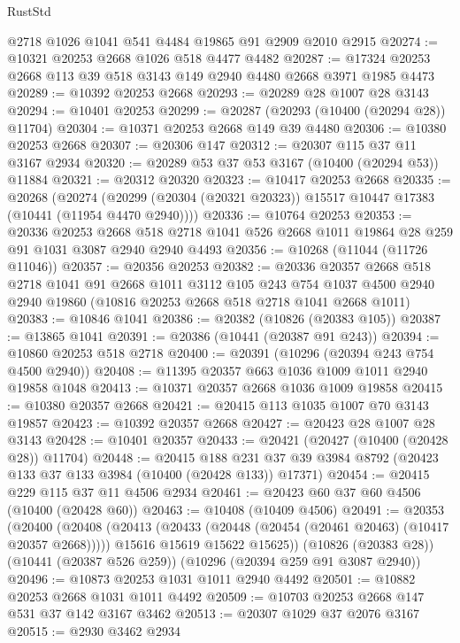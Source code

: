 \begin{lexlean}{RustStd}
\begin{coremodule}
    @2718
    @1026
    @1041
    @541
    @4484
    @19865
    @91
    @2909
    @2010
    @2915
@20274 := @10321 @20253 @2668 @1026 @518 @4477 @4482
@20287 := @17324 @20253 @2668 @113 @39 @518 @3143 @149 @2940 @4480 @2668 @3971 @1985 @4473
@20289 := @10392 @20253 @2668
@20293 := @20289 @28 @1007 @28 @3143
@20294 := @10401 @20253
@20299 := @20287 (@20293 (@10400 (@20294 @28)) @11704)
@20304 := @10371 @20253 @2668 @149 @39 @4480
@20306 := @10380 @20253 @2668
@20307 := @20306 @147
@20312 := @20307 @115 @37 @11 @3167 @2934
@20320 := @20289 @53 @37 @53 @3167 (@10400 (@20294 @53)) @11884
@20321 := @20312 @20320
@20323 := @10417 @20253 @2668
@20335 := @20268
    (@20274 (@20299 (@20304 (@20321 @20323)) @15517 @10447 @17383 (@10441 (@11954 @4470 @2940))))
@20336 := @10764 @20253
@20353 := @20336
    @20253
    @2668
    @518
    @2718
    @1041
    @526
    @2668
    @1011
    @19864
    @28
    @259
    @91
    @1031
    @3087
    @2940
    @2940
    @4493
@20356 := @10268 (@11044 (@11726 @11046))
@20357 := @20356 @20253
@20382 := @20336
    @20357
    @2668
    @518
    @2718
    @1041
    @91
    @2668
    @1011
    @3112
    @105
    @243
    @754
    @1037
    @4500
    @2940
    @2940
    @19860
    (@10816 @20253 @2668 @518 @2718 @1041 @2668 @1011)
@20383 := @10846 @1041
@20386 := @20382 (@10826 (@20383 @105))
@20387 := @13865 @1041
@20391 := @20386 (@10441 (@20387 @91 @243))
@20394 := @10860 @20253 @518 @2718
@20400 := @20391 (@10296 (@20394 @243 @754 @4500 @2940))
@20408 := @11395 @20357 @663 @1036 @1009 @1011 @2940 @19858 @1048
@20413 := @10371 @20357 @2668 @1036 @1009 @19858
@20415 := @10380 @20357 @2668
@20421 := @20415 @113 @1035 @1007 @70 @3143 @19857
@20423 := @10392 @20357 @2668
@20427 := @20423 @28 @1007 @28 @3143
@20428 := @10401 @20357
@20433 := @20421 (@20427 (@10400 (@20428 @28)) @11704)
@20448 := @20415
    @188
    @231
    @37
    @39
    @3984
    @8792
    (@20423 @133 @37 @133 @3984 (@10400 (@20428 @133)) @17371)
@20454 := @20415 @229 @115 @37 @11 @4506 @2934
@20461 := @20423 @60 @37 @60 @4506 (@10400 (@20428 @60))
@20463 := @10408 (@10409 @4506)
@20491 := @20353
    (@20400
      (@20408
        (@20413 (@20433 (@20448 (@20454 (@20461 @20463) (@10417 @20357 @2668)))))
        @15616
        @15619
        @15622
        @15625))
    (@10826 (@20383 @28))
    (@10441 (@20387 @526 @259))
    (@10296 (@20394 @259 @91 @3087 @2940))
@20496 := @10873 @20253 @1031 @1011 @2940 @4492
@20501 := @10882 @20253 @2668 @1031 @1011 @4492
@20509 := @10703 @20253 @2668 @147 @531 @37 @142 @3167 @3462
@20513 := @20307 @1029 @37 @2076 @3167
@20515 := @2930 @3462 @2934

\end{coremodule}
\end{lexlean}
